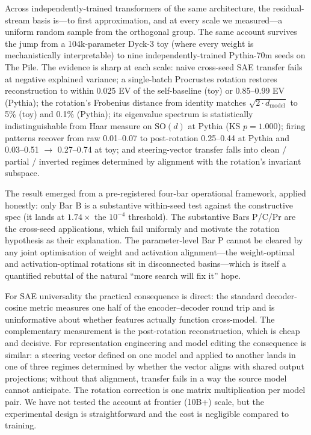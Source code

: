 \documentclass[11pt,letterpaper]{article}
\newcommand{\dmodel}{d_{\mathrm{model}}}
\begin{document}
Across independently-trained transformers of the same architecture, the residual-stream basis is---to first approximation, and at every scale we measured---a uniform random sample from the orthogonal group. The same account survives the jump from a 104k-parameter Dyck-3 toy (where every weight is mechanistically interpretable) to nine independently-trained Pythia-70m seeds on The Pile. The evidence is sharp at each scale: naive cross-seed SAE transfer fails at negative explained variance; a single-batch Procrustes rotation restores reconstruction to within 0.025 EV of the self-baseline (toy) or 0.85--0.99 EV (Pythia); the rotation's Frobenius distance from identity matches $\sqrt{2 \cdot \dmodel}$ to 5\% (toy) and 0.1\% (Pythia); its eigenvalue spectrum is statistically indistinguishable from Haar measure on $\mathrm{SO}(d)$ at Pythia (KS $p = 1.000$); firing patterns recover from raw 0.01--0.07 to post-rotation 0.25--0.44 at Pythia and 0.03--0.51 $\to$ 0.27--0.74 at toy; and steering-vector transfer falls into clean / partial / inverted regimes determined by alignment with the rotation's invariant subspace.

The result emerged from a pre-registered four-bar operational framework, applied honestly: only Bar B is a substantive within-seed test against the constructive spec (it lands at $1.74\times$ the $10^{-4}$ threshold). The substantive Bars P/C/Pr are the cross-seed applications, which fail uniformly and motivate the rotation hypothesis as their explanation. The parameter-level Bar P cannot be cleared by any joint optimisation of weight and activation alignment---the weight-optimal and activation-optimal rotations sit in disconnected basins---which is itself a quantified rebuttal of the natural ``more search will fix it'' hope.

For SAE universality the practical consequence is direct: the standard decoder-cosine metric measures one half of the encoder--decoder round trip and is uninformative about whether features actually function cross-model. The complementary measurement is the post-rotation reconstruction, which is cheap and decisive. For representation engineering and model editing the consequence is similar: a steering vector defined on one model and applied to another lands in one of three regimes determined by whether the vector aligns with shared output projections; without that alignment, transfer fails in a way the source model cannot anticipate. The rotation correction is one matrix multiplication per model pair. We have not tested the account at frontier (10B+) scale, but the experimental design is straightforward and the cost is negligible compared to training.
\end{document}
